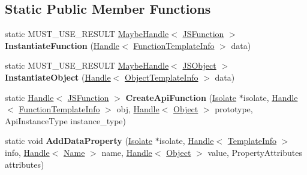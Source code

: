 \subsection*{Static Public Member Functions}
\begin{DoxyCompactItemize}
\item 
static M\+U\+S\+T\+\_\+\+U\+S\+E\+\_\+\+R\+E\+S\+U\+LT \hyperlink{classv8_1_1internal_1_1_maybe_handle}{Maybe\+Handle}$<$ \hyperlink{classv8_1_1internal_1_1_j_s_function}{J\+S\+Function} $>$ {\bfseries Instantiate\+Function} (\hyperlink{classv8_1_1internal_1_1_handle}{Handle}$<$ \hyperlink{classv8_1_1internal_1_1_function_template_info}{Function\+Template\+Info} $>$ data)\hypertarget{classv8_1_1internal_1_1_api_natives_a7e1150fde2bed4a4d1c2039f053e5de6}{}\label{classv8_1_1internal_1_1_api_natives_a7e1150fde2bed4a4d1c2039f053e5de6}

\item 
static M\+U\+S\+T\+\_\+\+U\+S\+E\+\_\+\+R\+E\+S\+U\+LT \hyperlink{classv8_1_1internal_1_1_maybe_handle}{Maybe\+Handle}$<$ \hyperlink{classv8_1_1internal_1_1_j_s_object}{J\+S\+Object} $>$ {\bfseries Instantiate\+Object} (\hyperlink{classv8_1_1internal_1_1_handle}{Handle}$<$ \hyperlink{classv8_1_1internal_1_1_object_template_info}{Object\+Template\+Info} $>$ data)\hypertarget{classv8_1_1internal_1_1_api_natives_a41f2a1366a63626da65f9a6209921d40}{}\label{classv8_1_1internal_1_1_api_natives_a41f2a1366a63626da65f9a6209921d40}

\item 
static \hyperlink{classv8_1_1internal_1_1_handle}{Handle}$<$ \hyperlink{classv8_1_1internal_1_1_j_s_function}{J\+S\+Function} $>$ {\bfseries Create\+Api\+Function} (\hyperlink{classv8_1_1internal_1_1_isolate}{Isolate} $\ast$isolate, \hyperlink{classv8_1_1internal_1_1_handle}{Handle}$<$ \hyperlink{classv8_1_1internal_1_1_function_template_info}{Function\+Template\+Info} $>$ obj, \hyperlink{classv8_1_1internal_1_1_handle}{Handle}$<$ \hyperlink{classv8_1_1internal_1_1_object}{Object} $>$ prototype, Api\+Instance\+Type instance\+\_\+type)\hypertarget{classv8_1_1internal_1_1_api_natives_a743e0ee576669f8618704dcb95e97b74}{}\label{classv8_1_1internal_1_1_api_natives_a743e0ee576669f8618704dcb95e97b74}

\item 
static void {\bfseries Add\+Data\+Property} (\hyperlink{classv8_1_1internal_1_1_isolate}{Isolate} $\ast$isolate, \hyperlink{classv8_1_1internal_1_1_handle}{Handle}$<$ \hyperlink{classv8_1_1internal_1_1_template_info}{Template\+Info} $>$ info, \hyperlink{classv8_1_1internal_1_1_handle}{Handle}$<$ \hyperlink{classv8_1_1internal_1_1_name}{Name} $>$ name, \hyperlink{classv8_1_1internal_1_1_handle}{Handle}$<$ \hyperlink{classv8_1_1internal_1_1_object}{Object} $>$ value, Property\+Attributes attributes)\hypertarget{classv8_1_1internal_1_1_api_natives_ae3ee4ad0fcbf129bbdc461d1bb3efa1a}{}\label{classv8_1_1internal_1_1_api_natives_ae3ee4ad0fcbf129bbdc461d1bb3efa1a}


\end{DoxyCompactItemize}

